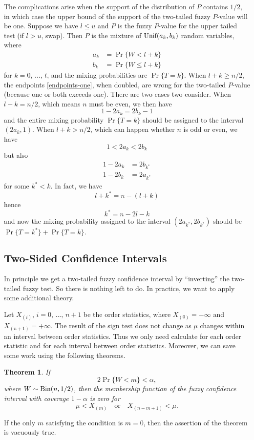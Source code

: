 \documentclass{article}
\newcommand{\BinomialDis}{\text{\upshape Bin}}
\newcommand{\UniformDis}{\text{\upshape Unif}}
\newtheorem{theorem}{Theorem}
\begin{document}
The complications arise when the support of the distribution of $P$ contains
$1 / 2$, in which case the upper bound of the support of the two-tailed
fuzzy $P$-value will be one.  Suppose we have $l \le u$ and $P$ is the fuzzy
$P$-value for the upper tailed test (if $l > u$, swap).  Then $P$
is the mixture of $\UniformDis(a_k, b_k)$ random variables, where
\begin{equation} \label{endpoints-one}
\begin{split}
   a_k & = \Pr\{ W < l + k \}
   \\
   b_k & = \Pr\{ W \le l + k \}
\end{split}
\end{equation}
for $k = 0$, $\ldots$, $t$, and the mixing probabilities
are $\Pr\{ T = k \}$.  When $l + k \ge n / 2$, the endpoints
\eqref{endpoints-one}, when doubled, are wrong for the two-tailed $P$-value
(because one or both exceeds one).  There are two cases two consider.
When $l + k = n / 2$, which means $n$ must be even, we then have
$$
   1 - 2 a_k = 2 b_k - 1
$$
and the entire mixing probability $\Pr\{ T = k \}$ should be assigned
to the interval $(2 a_k, 1)$.
When $l + k > n / 2$, which can happen whether $n$ is odd or even, we have
$$
   1 < 2 a_k < 2 b_k
$$
but also
\begin{align*}
   1 - 2 a_k & = 2 b_{k^*}
   \\
   1 - 2 b_k & = 2 a_{k^*}
\end{align*}
for some $k^* < k$.  In fact, we have
$$
   l + k^* = n - (l + k)
$$
hence
$$
   k^* = n - 2 l - k
$$
and now the mixing probability assigned to the
interval $(2 a_{k^*}, 2 b_{k^*})$ should be
$\Pr\{ T = k^* \} + \Pr\{ T = k \}$.

\subsection{Two-Sided Confidence Intervals}

In principle we get a two-tailed fuzzy confidence interval by ``inverting''
the two-tailed fuzzy test.  So there is nothing left to do.
In practice, we want to apply some additional theory.

Let $X_{(i)}$, $i = 0$, $\ldots$, $n + 1$ be the order statistics,
where $X_{(0)} = - \infty$ and $X_{(n + 1)} = + \infty$.
The result of the sign test does not change as $\mu$ changes within an
interval between order statistics.  Thus we only need calculate for each
order statistic and for each interval between order statistics.
Moreover, we can save some work using the following theorems.
\begin{theorem} \label{th:zero}
If
$$
   2 \Pr \{ W < m \} < \alpha,
$$
where $W \sim \BinomialDis(n, 1 / 2)$, then the membership function of
the fuzzy confidence interval with coverage $1 - \alpha$ is zero for
$$
   \mu < X_{(m)} \quad \text{or} \quad X_{(n - m + 1)} < \mu.
$$
\end{theorem}
If the only $m$ satisfying the condition is $m = 0$, then the assertion
of the theorem is vacuously true.
\end{document}

